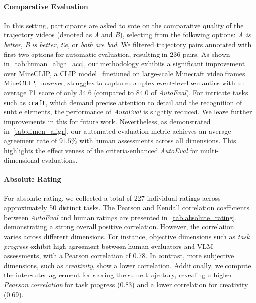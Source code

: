 

\paragraph{Comparative Evaluation} In this setting, participants are asked to vote on the comparative quality of the trajectory videos (denoted as \emph{A} and \emph{B}), selecting from the following options: \emph{A is better}, \emph{B is better}, \emph{tie}, or \emph{both are bad}. We filtered trajectory pairs annotated with first two options for automatic evaluation, resulting in 236 pairs. As shown in~\cref{tab:human_align_acc}, our methodology exhibits a significant improvement over MineCLIP, a CLIP model~\citep{clip} finetuned on large-scale Minecraft video frames. MineCLIP, however, struggles to capture complex event-level semantics with an average F1 score of only 34.6 (compared to 84.0 of \emph{AutoEval}). For intricate tasks such as \texttt{craft}, which demand precise attention to detail and the recognition of subtle elements, the performance of \emph{AutoEval} is slightly reduced. We leave further improvements in this for future work. Nevertheless, as demonstrated in~\cref{tab:dimen_align}, our automated evaluation metric achieves an average agreement rate of $91.5\%$ with human assessments across all dimensions. This highlights the effectiveness of the criteria-enhanced \emph{AutoEval} for multi-dimensional evaluations.


\paragraph{Absolute Rating}
For absolute rating, we collected a total of 227 individual ratings across approximately 50 distinct tasks. The Pearson and Kendall correlation coefficients between \emph{AutoEval} and human ratings are presented in~\cref{tab.absolute_rating}, demonstrating a strong overall positive correlation. However, the correlation varies across different dimensions. For instance, objective dimensions such as \emph{task progress} exhibit high agreement between human evaluators and VLM assessments, with a Pearson correlation of 0.78. In contrast, more subjective dimensions, such as \emph{creativity}, show a lower correlation. Additionally, we compute the inter-rater agreement for scoring the same trajectory, revealing a higher \emph{Pearson correlation} for task progress (0.83) and a lower correlation for creativity (0.69).

